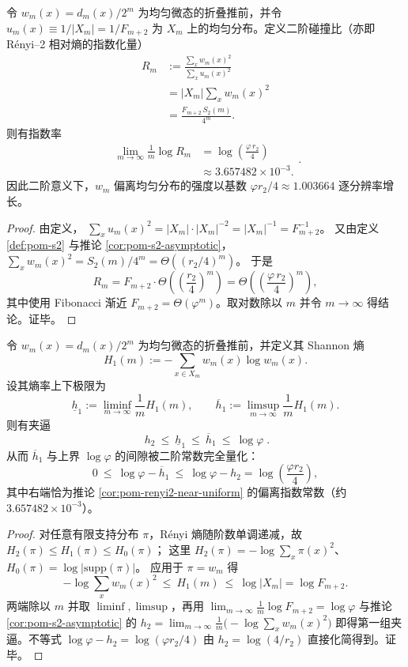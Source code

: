 \begin{corollary}\label{cor:pom-renyi2-near-uniform}
令 \(w_m(x)=d_m(x)/2^m\) 为均匀微态的折叠推前，并令 \(u_m(x)\equiv 1/|X_m|=1/F_{m+2}\) 为 \(X_m\) 上的均匀分布。定义二阶碰撞比（亦即 Rényi--2 相对熵的指数化量）
\[
\begin{aligned}
R_m
&:=\frac{\sum_x w_m(x)^2}{\sum_x u_m(x)^2}\\
&=|X_m|\sum_x w_m(x)^2\\
&=\frac{F_{m+2}\,S_2(m)}{4^m}.
\end{aligned}
\]
则有指数率
\[
\boxed{
\begin{aligned}
\lim_{m\to\infty}\frac{1}{m}\log R_m
&=\log\!\left(\frac{\varphi\,r_2}{4}\right)\\
&\approx 3.657482\times 10^{-3}.
\end{aligned}
}.
\]
因此二阶意义下，\(w_m\) 偏离均匀分布的强度以基数 \(\varphi r_2/4\approx 1.003664\) 逐分辨率增长。
\end{corollary}
\begin{proof}
由定义，
\(
\sum_x u_m(x)^2=|X_m|\cdot |X_m|^{-2}=|X_m|^{-1}=F_{m+2}^{-1}
\)。
又由定义 \ref{def:pom-s2} 与推论 \ref{cor:pom-s2-asymptotic}，
\(
\sum_x w_m(x)^2=S_2(m)/4^m=\Theta((r_2/4)^m)
\)。
于是
\[
R_m=F_{m+2}\cdot \Theta\!\left(\left(\frac{r_2}{4}\right)^m\right)
=\Theta\!\left(\left(\frac{\varphi\,r_2}{4}\right)^m\right),
\]
其中使用 Fibonacci 渐近 \(F_{m+2}=\Theta(\varphi^m)\)。取对数除以 \(m\) 并令 \(m\to\infty\) 得结论。证毕。
\end{proof}

\begin{corollary}[熵谱夹逼：\texorpdfstring{$h_2\le h_1\le \log\varphi$}{h2<=h1<=log phi}]\label{cor:pom-shannon-entropy-squeeze}
令 \(w_m(x)=d_m(x)/2^m\) 为均匀微态的折叠推前，并定义其 Shannon 熵
\[
H_1(m):=-\sum_{x\in X_m}w_m(x)\log w_m(x).
\]
设其熵率上下极限为
\[
\underline h_1:=\liminf_{m\to\infty}\frac{1}{m}H_1(m),
\qquad
\overline h_1:=\limsup_{m\to\infty}\frac{1}{m}H_1(m).
\]
则有夹逼
\[
\boxed{\;
h_2\ \le\ \underline h_1\ \le\ \overline h_1\ \le\ \log\varphi\; }.
\]
从而 \(\overline h_1\) 与上界 \(\log\varphi\) 的间隙被二阶常数完全量化：
\[
0\ \le\ \log\varphi-\overline h_1\ \le\ \log\varphi-h_2
=\log\!\left(\frac{\varphi r_2}{4}\right),
\]
其中右端恰为推论 \ref{cor:pom-renyi2-near-uniform} 的偏离指数常数（约 \(3.657482\times 10^{-3}\)）。
\end{corollary}
\begin{proof}
对任意有限支持分布 \(\pi\)，Rényi 熵随阶数单调递减，故 \(H_2(\pi)\le H_1(\pi)\le H_0(\pi)\)；
这里 \(H_2(\pi)=-\log\sum_x\pi(x)^2\)、\(H_0(\pi)=\log|\mathrm{supp}(\pi)|\)。
应用于 \(\pi=w_m\) 得
\[
-\log\sum_x w_m(x)^2\ \le\ H_1(m)\ \le\ \log|X_m|=\log F_{m+2}.
\]
两端除以 \(m\) 并取 \(\liminf,\limsup\)，再用 \(\lim_{m\to\infty}\frac{1}{m}\log F_{m+2}=\log\varphi\) 与推论 \ref{cor:pom-s2-asymptotic} 的
\(
h_2=\lim_{m\to\infty}\frac{1}{m}\bigl(-\log\sum_x w_m(x)^2\bigr)
\)
即得第一组夹逼。不等式 \(\log\varphi-h_2=\log(\varphi r_2/4)\) 由 \(h_2=\log(4/r_2)\) 直接化简得到。证毕。
\end{proof}

